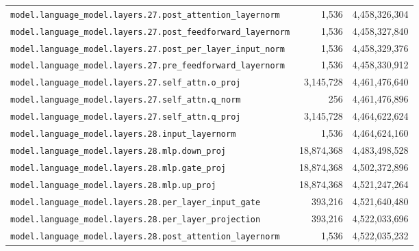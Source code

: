 \documentclass[10pt,a4paper]{article}
\theoremstyle{definition}
\begin{document}
\begin{appendices}
\begin{longtable}{p{9.5cm}rr}
\texttt{model.\allowbreak{}language\_model.\allowbreak{}layers.\allowbreak{}27.\allowbreak{}post\_attention\_layernorm} & 1,536 & 4,458,326,304 \\
\texttt{model.\allowbreak{}language\_model.\allowbreak{}layers.\allowbreak{}27.\allowbreak{}post\_feedforward\_layernorm} & 1,536 & 4,458,327,840 \\
\texttt{model.\allowbreak{}language\_model.\allowbreak{}layers.\allowbreak{}27.\allowbreak{}post\_per\_layer\_input\_norm} & 1,536 & 4,458,329,376 \\
\texttt{model.\allowbreak{}language\_model.\allowbreak{}layers.\allowbreak{}27.\allowbreak{}pre\_feedforward\_layernorm} & 1,536 & 4,458,330,912 \\
\texttt{model.\allowbreak{}language\_model.\allowbreak{}layers.\allowbreak{}27.\allowbreak{}self\_attn.\allowbreak{}o\_proj} & 3,145,728 & 4,461,476,640 \\
\texttt{model.\allowbreak{}language\_model.\allowbreak{}layers.\allowbreak{}27.\allowbreak{}self\_attn.\allowbreak{}q\_norm} & 256 & 4,461,476,896 \\
\texttt{model.\allowbreak{}language\_model.\allowbreak{}layers.\allowbreak{}27.\allowbreak{}self\_attn.\allowbreak{}q\_proj} & 3,145,728 & 4,464,622,624 \\
\texttt{model.\allowbreak{}language\_model.\allowbreak{}layers.\allowbreak{}28.\allowbreak{}input\_layernorm} & 1,536 & 4,464,624,160 \\
\texttt{model.\allowbreak{}language\_model.\allowbreak{}layers.\allowbreak{}28.\allowbreak{}mlp.\allowbreak{}down\_proj} & 18,874,368 & 4,483,498,528 \\
\texttt{model.\allowbreak{}language\_model.\allowbreak{}layers.\allowbreak{}28.\allowbreak{}mlp.\allowbreak{}gate\_proj} & 18,874,368 & 4,502,372,896 \\
\texttt{model.\allowbreak{}language\_model.\allowbreak{}layers.\allowbreak{}28.\allowbreak{}mlp.\allowbreak{}up\_proj} & 18,874,368 & 4,521,247,264 \\
\texttt{model.\allowbreak{}language\_model.\allowbreak{}layers.\allowbreak{}28.\allowbreak{}per\_layer\_input\_gate} & 393,216 & 4,521,640,480 \\
\texttt{model.\allowbreak{}language\_model.\allowbreak{}layers.\allowbreak{}28.\allowbreak{}per\_layer\_projection} & 393,216 & 4,522,033,696 \\
\texttt{model.\allowbreak{}language\_model.\allowbreak{}layers.\allowbreak{}28.\allowbreak{}post\_attention\_layernorm} & 1,536 & 4,522,035,232 \\

\end{longtable}
\end{appendices}
\end{document}
